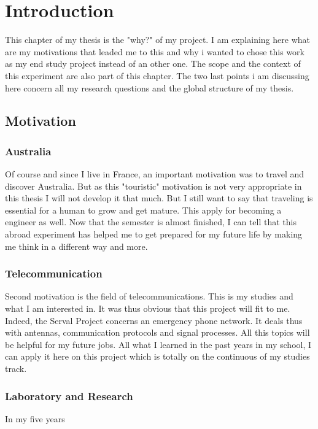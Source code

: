 \chapter{Introduction}

This chapter of my thesis is the "why?" of my project. I am explaining here what are my motivations that leaded me to this and why i wanted to chose this work as my end study project instead of an other one. The scope and the context of this experiment are also part of this chapter. The two last points i am discussing here concern all my research questions and the global structure of my thesis.

\section{Motivation}

\subsection{Australia}
Of course and since I live in France, an important motivation was to travel and discover Australia. But as this "touristic" motivation is not very appropriate in this thesis I will not develop it that much. But I still want to say that traveling is essential for a human to grow and get mature. This apply for becoming a engineer as well. Now that the semester is almost finished, I can tell that this abroad experiment has helped me to get prepared for my future life by making me think in a different way and more.\\

\subsection{Telecommunication}
Second motivation is the field of telecommunications. This is my studies and what I am interested in. It was thus obvious that this project will fit to me. Indeed, the Serval Project concerns an emergency phone network. It deals thus with antennas, communication protocols and signal processes. All this topics will be helpful for my future jobs. All what I learned in the past years in my school, I can apply it here on this project which is totally on the continuous of my studies track. 

\subsection{Laboratory and Research}
In my five years 

